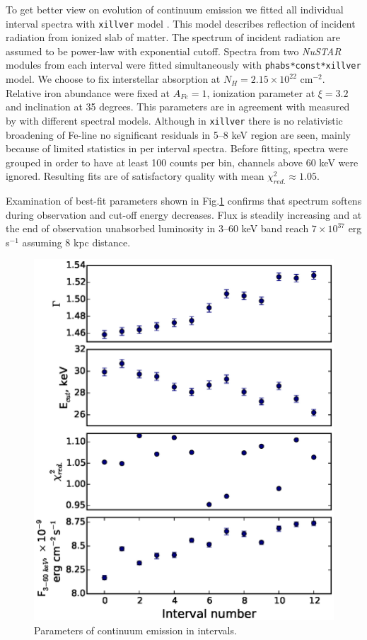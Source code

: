 \documentclass[a4paper,fleqn,usenatbib]{mnras}
\def\nustar{{\em NuSTAR\,}}
\begin{document}
To get better view on evolution of continuum emission we fitted all individual interval spectra with \texttt{xillver} model \citep{garcia13}. This model describes reflection of incident radiation from ionized slab of matter. The spectrum of incident radiation are assumed to be power-law with exponential cutoff. Spectra from two \nustar\, modules from each interval were fitted simultaneously with \texttt{phabs*const*xillver} model. We choose to fix interstellar absorption at $N_{H} = 2.15\times10^{22}$ cm$^{-2}$. Relative iron abundance were fixed at
 $A_{Fe} = 1$, ionization parameter at $\xi=3.2$ and inclination at 35 degrees. This parameters are in agreement with measured by \cite{miller15_nust} with different spectral models. Although in  \texttt{xillver} there is no relativistic broadening of Fe-line no significant residuals in 5--8 keV region are seen, mainly because of limited statistics in per interval spectra. Before fitting, spectra were grouped in order to have at least 100 counts per bin, channels above 60 keV were ignored. Resulting fits are of satisfactory quality with mean $\chi^{2}_{red.} \approx 1.05$. 
 
Examination of best-fit parameters shown in Fig.\ref{fig:intspe} confirms that spectrum softens during observation and cut-off energy decreases. Flux is steadily increasing and at the end of observation unabsorbed luminosity in 3--60 keV band reach  $7\times10^{37}$ erg s$^{-1}$ assuming 8 kpc distance.

\begin{figure}
\centerline{\includegraphics[width=\linewidth]{intspe_v01.eps}}
\caption{Parameters of continuum emission in intervals. } 
\label{fig:intspe}
\end{figure}  
            
\end{document}
